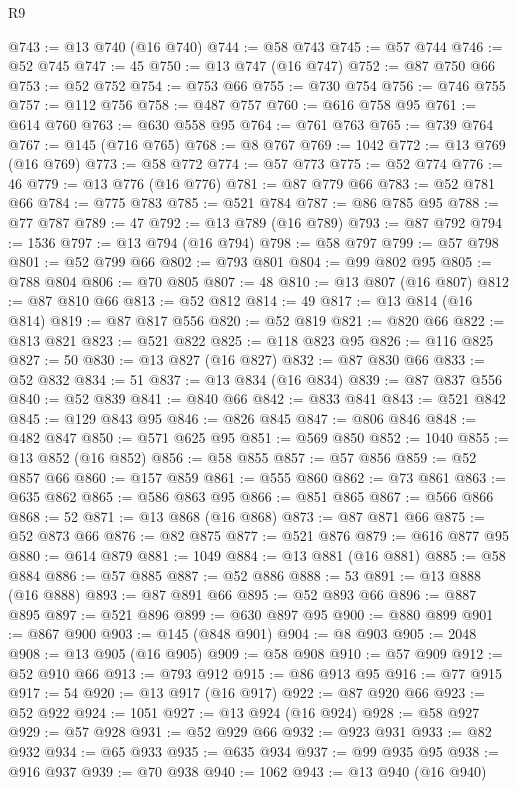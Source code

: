 \begin{lexlean}{R9}
\begin{coremodule}
@743 := @13 @740 (@16 @740)
@744 := @58 @743
@745 := @57 @744
@746 := @52 @745
@747 := 45
@750 := @13 @747 (@16 @747)
@752 := @87 @750 @66
@753 := @52 @752
@754 := @753 @66
@755 := @730 @754
@756 := @746 @755
@757 := @112 @756
@758 := @487 @757
@760 := @616 @758 @95
@761 := @614 @760
@763 := @630 @558 @95
@764 := @761 @763
@765 := @739 @764
@767 := @145 (@716 @765)
@768 := @8 @767
@769 := 1042
@772 := @13 @769 (@16 @769)
@773 := @58 @772
@774 := @57 @773
@775 := @52 @774
@776 := 46
@779 := @13 @776 (@16 @776)
@781 := @87 @779 @66
@783 := @52 @781 @66
@784 := @775 @783
@785 := @521 @784
@787 := @86 @785 @95
@788 := @77 @787
@789 := 47
@792 := @13 @789 (@16 @789)
@793 := @87 @792
@794 := 1536
@797 := @13 @794 (@16 @794)
@798 := @58 @797
@799 := @57 @798
@801 := @52 @799 @66
@802 := @793 @801
@804 := @99 @802 @95
@805 := @788 @804
@806 := @70 @805
@807 := 48
@810 := @13 @807 (@16 @807)
@812 := @87 @810 @66
@813 := @52 @812
@814 := 49
@817 := @13 @814 (@16 @814)
@819 := @87 @817 @556
@820 := @52 @819
@821 := @820 @66
@822 := @813 @821
@823 := @521 @822
@825 := @118 @823 @95
@826 := @116 @825
@827 := 50
@830 := @13 @827 (@16 @827)
@832 := @87 @830 @66
@833 := @52 @832
@834 := 51
@837 := @13 @834 (@16 @834)
@839 := @87 @837 @556
@840 := @52 @839
@841 := @840 @66
@842 := @833 @841
@843 := @521 @842
@845 := @129 @843 @95
@846 := @826 @845
@847 := @806 @846
@848 := @482 @847
@850 := @571 @625 @95
@851 := @569 @850
@852 := 1040
@855 := @13 @852 (@16 @852)
@856 := @58 @855
@857 := @57 @856
@859 := @52 @857 @66
@860 := @157 @859
@861 := @555 @860
@862 := @73 @861
@863 := @635 @862
@865 := @586 @863 @95
@866 := @851 @865
@867 := @566 @866
@868 := 52
@871 := @13 @868 (@16 @868)
@873 := @87 @871 @66
@875 := @52 @873 @66
@876 := @82 @875
@877 := @521 @876
@879 := @616 @877 @95
@880 := @614 @879
@881 := 1049
@884 := @13 @881 (@16 @881)
@885 := @58 @884
@886 := @57 @885
@887 := @52 @886
@888 := 53
@891 := @13 @888 (@16 @888)
@893 := @87 @891 @66
@895 := @52 @893 @66
@896 := @887 @895
@897 := @521 @896
@899 := @630 @897 @95
@900 := @880 @899
@901 := @867 @900
@903 := @145 (@848 @901)
@904 := @8 @903
@905 := 2048
@908 := @13 @905 (@16 @905)
@909 := @58 @908
@910 := @57 @909
@912 := @52 @910 @66
@913 := @793 @912
@915 := @86 @913 @95
@916 := @77 @915
@917 := 54
@920 := @13 @917 (@16 @917)
@922 := @87 @920 @66
@923 := @52 @922
@924 := 1051
@927 := @13 @924 (@16 @924)
@928 := @58 @927
@929 := @57 @928
@931 := @52 @929 @66
@932 := @923 @931
@933 := @82 @932
@934 := @65 @933
@935 := @635 @934
@937 := @99 @935 @95
@938 := @916 @937
@939 := @70 @938
@940 := 1062
@943 := @13 @940 (@16 @940)

\end{coremodule}
\end{lexlean}
